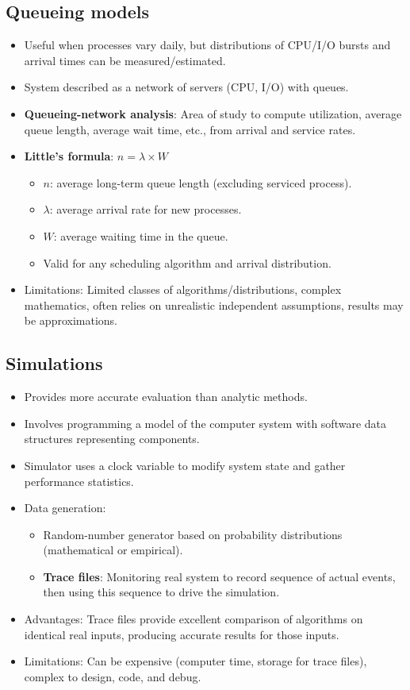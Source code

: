 \subsection{Queueing models}
\begin{itemize}
    \item Useful when processes vary daily, but distributions of CPU/I/O bursts and arrival times can be measured/estimated.
    \item System described as a network of servers (CPU, I/O) with queues.
    \item \textbf{Queueing-network analysis}: Area of study to compute utilization, average queue length, average wait time, etc., from arrival and service rates.
    \item \textbf{Little's formula}: $n = \lambda \times W$
        \begin{itemize}
            \item $n$: average long-term queue length (excluding serviced process).
            \item $\lambda$: average arrival rate for new processes.
            \item $W$: average waiting time in the queue.
            \item Valid for any scheduling algorithm and arrival distribution.
        \end{itemize}
    \item Limitations: Limited classes of algorithms/distributions, complex mathematics, often relies on unrealistic independent assumptions, results may be approximations.
\end{itemize}

\subsection{Simulations}
\begin{itemize}
    \item Provides more accurate evaluation than analytic methods.
    \item Involves programming a model of the computer system with software data structures representing components.
    \item Simulator uses a clock variable to modify system state and gather performance statistics.
    \item Data generation:
        \begin{itemize}
            \item Random-number generator based on probability distributions (mathematical or empirical).
            \item \textbf{Trace files}: Monitoring real system to record sequence of actual events, then using this sequence to drive the simulation.
        \end{itemize}
    \item Advantages: Trace files provide excellent comparison of algorithms on identical real inputs, producing accurate results for those inputs.
    \item Limitations: Can be expensive (computer time, storage for trace files), complex to design, code, and debug.
\end{itemize}

